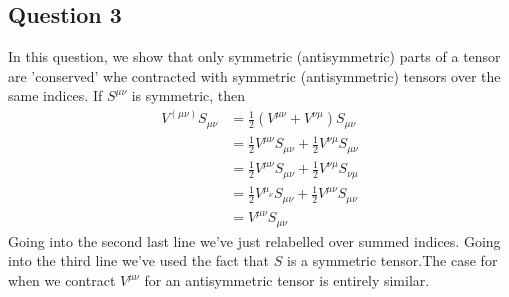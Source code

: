 \subsection{Question 3} 
In this question, we show that only symmetric (antisymmetric) parts of a tensor are 'conserved' whe contracted with symmetric (antisymmetric) tensors over the same indices. If $S^{ \mu \nu} $ is symmetric, then 
\begin{align*} 
V^{ ( \mu \nu) } S_{\mu \nu}  & = \frac{1}{2} \left( V^{ \mu \nu} + V^{ \nu \mu} \right)S_{ \mu \nu} \\
&= \frac{1}{2} V^{\mu \nu}S_{ \mu \nu} + \frac{1}{2} V^{ \nu \mu} S_{\mu \nu} \\
&= \frac{1}{2} V^{\mu \nu}S_{ \mu \nu} + \frac{1}{2} V^{\nu \mu}S_{ \nu \mu } \\
&= \frac{1}{ 2} V^{\mu_\nu} S_{ \mu \nu} + \frac{1}{2} V^{\mu \nu}S_{ \mu \nu} \\
&= V^{ \mu \nu} S_{ \mu \nu} 
\end{align*} 
Going into the second last line we've just relabelled over summed indices. Going into the third line we've used the fact that $S$ is a symmetric tensor.The case for when we contract $V^{\mu \nu}$ for an antisymmetric tensor is entirely similar. 



\pagebreak 
